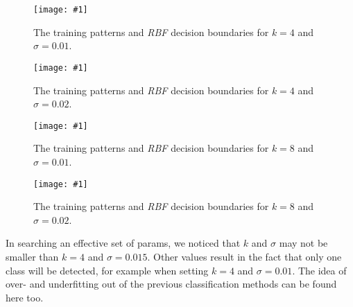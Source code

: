 \documentclass[a4paper,headings=small]{scrartcl}
\newcommand{\image}[3]{
\begin{figure}[htbp]
\centering
\texttt{[image: \#1]}
\caption{#3}
\label{fig:#1}
\end{figure}
}
\begin{document}
\image{out_classifierRbf_k_4_sigma_001}{\classifierPlotWidth}%
	{The training patterns and \emph{RBF} decision boundaries for $k = 4$ and $\sigma = 0.01$.}

\image{out_classifierRbf_k_4_sigma_002}{\classifierPlotWidth}%
	{The training patterns and \emph{RBF} decision boundaries for $k = 4$ and $\sigma = 0.02$.}

\image{out_classifierRbf_k_8_sigma_001}{\classifierPlotWidth}%
	{The training patterns and \emph{RBF} decision boundaries for $k = 8$ and $\sigma = 0.01$.}

\image{out_classifierRbf_k_8_sigma_002}{\classifierPlotWidth}%
	{The training patterns and \emph{RBF} decision boundaries for $k = 8$ and $\sigma = 0.02$.}

In searching an effective set of params, we noticed that $k$ and $\sigma$ may not be smaller than $k = 4$ and $\sigma = 0.015$.
Other values result in the fact that only one class will be detected,
for example when setting $k = 4$ and $\sigma = 0.01$.
The idea of over- and underfitting out of the previous classification methods can be found here too.
\end{document}
